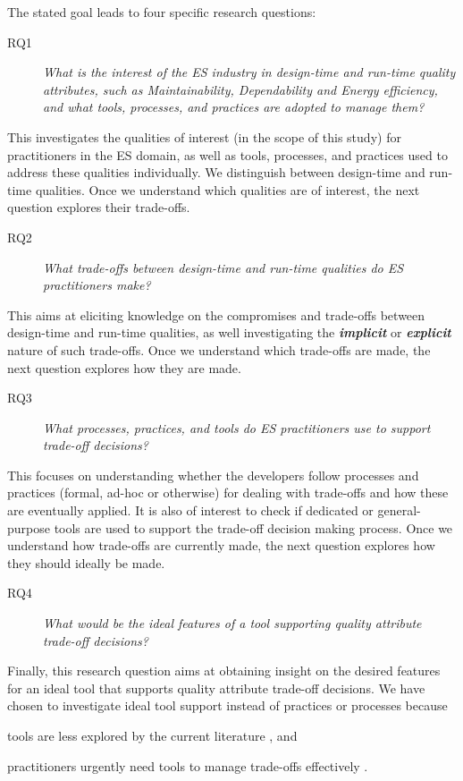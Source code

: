 The stated goal leads to four specific research questions:
\begin{description}
    \item[RQ1] \textit{What is the interest of the ES industry in design-time and run-time quality attributes, such as Maintainability, Dependability and Energy efficiency, and what tools, processes, and practices are adopted to manage them?}
\end{description}
This investigates the qualities of interest (in the scope of this study) for practitioners in the ES domain, as well as tools, processes, and practices used to address these qualities individually. We distinguish between design-time and run-time qualities. Once we understand which qualities are of interest, the next question explores their trade-offs. \begin{description}
    \item[RQ2] \textit{What trade-offs between design-time and run-time qualities do ES practitioners make?}
\end{description}
This aims at eliciting knowledge on the compromises and trade-offs between design-time and run-time qualities, as well investigating the \textbf{\textit{implicit}} or \textbf{\textit{explicit}} nature of such trade-offs. Once we understand which trade-offs are made, the next question explores how they are made.
\begin{description}
    \item[RQ3] \textit{What processes, practices, and tools do ES practitioners use to support trade-off decisions?}
\end{description}
This focuses on understanding whether the developers follow processes and practices (formal, ad-hoc or otherwise) for dealing with trade-offs and how these are eventually applied. It is also of interest to check if dedicated or general-purpose tools are used to support the trade-off decision making process. Once we understand how trade-offs are currently made, the next question explores how they should ideally be made.
\begin{description}
    \item[RQ4] \textit{What would be the ideal features of a tool supporting quality attribute trade-off decisions?}
\end{description}
Finally, this research question aims at obtaining insight on the desired features for an ideal tool that supports quality attribute trade-off decisions.
We have chosen to investigate ideal tool support instead of practices or processes because \begin{inlinelist}\item tools are less explored by the current literature \cite{Barney2012}, and\item practitioners urgently need tools to manage trade-offs effectively \cite{Ampatzoglou2016}.\end{inlinelist}

